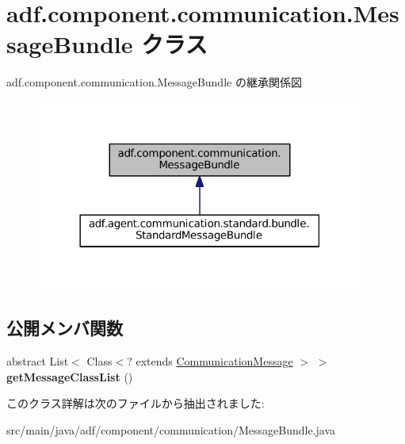 \hypertarget{classadf_1_1component_1_1communication_1_1MessageBundle}{}\section{adf.\+component.\+communication.\+Message\+Bundle クラス}
\label{classadf_1_1component_1_1communication_1_1MessageBundle}


adf.\+component.\+communication.\+Message\+Bundle の継承関係図
\nopagebreak
\begin{figure}[H]
\begin{center}
\leavevmode
\includegraphics[width=306pt]{classadf_1_1component_1_1communication_1_1MessageBundle__inherit__graph}
\end{center}
\end{figure}
\subsection*{公開メンバ関数}
\begin{DoxyCompactItemize}
\item 
\hypertarget{classadf_1_1component_1_1communication_1_1MessageBundle_a1c7c92e95af39e483a098cee1ce3c21c}{}\label{classadf_1_1component_1_1communication_1_1MessageBundle_a1c7c92e95af39e483a098cee1ce3c21c} 
abstract List$<$ Class$<$? extends \hyperlink{classadf_1_1component_1_1communication_1_1CommunicationMessage}{Communication\+Message} $>$ $>$ {\bfseries get\+Message\+Class\+List} ()
\end{DoxyCompactItemize}


このクラス詳解は次のファイルから抽出されました\+:\begin{DoxyCompactItemize}
\item 
src/main/java/adf/component/communication/Message\+Bundle.\+java\end{DoxyCompactItemize}
